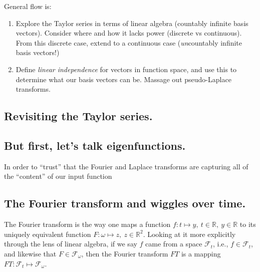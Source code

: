 \documentclass[letterpaper,12pt]{report}
\begin{document}

General flow is:

\begin{enumerate}
  \item
    Explore the Taylor series in terms of linear algebra (countably infinite basis vectors).
    Consider where and how it lacks power (discrete vs continuous).
    From this discrete case, extend to a continuous case
    (\emph{un}countably infinite basis vectors!)
  \item
    Define \emph{linear independence} for vectors in function space, 
    and use this to determine what our basis vectors can be.
    Massage out pseudo-Laplace transforms.

\end{enumerate}

\subsection{Revisiting the Taylor series.}












\subsection{But first, let's talk eigenfunctions.}

In order to ``trust'' that the Fourier and Laplace transforms are capturing all of the
``content'' of our input function


\subsection{The Fourier transform and wiggles over time.}

The Fourier transform is the way one maps a function
\(f: t \mapsto y,\ t \in \mathbb{R}, \ y \in \mathbb{R}\)
to its uniquely equivalent function \(F: \omega \mapsto z, \ z \in \mathbb{R}^2\).
Looking at it more explicitly through the lens of linear algebra,
if we say \(f\) came from a space \(\mathcal{F}_t\), i.e., \(f \in \mathcal{F}_t\), and
likewise that \(F \in \mathcal{F}_\omega\), then the Fourier transform \(FT\) is a mapping
\(FT: \mathcal{F}_t \mapsto \mathcal{F}_\omega\).\par
\end{document}
